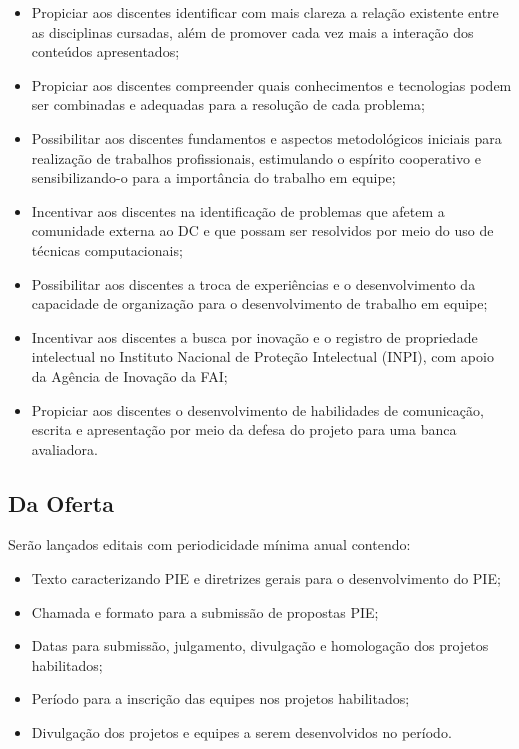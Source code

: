 \begin{itemize}
    \item Propiciar aos discentes identificar com mais clareza a relação existente entre as disciplinas cursadas, além de promover cada vez mais a interação dos conteúdos apresentados;
    
    \item Propiciar aos discentes compreender quais conhecimentos e tecnologias podem ser combinadas e adequadas para a resolução de cada problema;
    
    \item Possibilitar aos discentes fundamentos e aspectos metodológicos iniciais para realização de trabalhos profissionais, estimulando o espírito cooperativo e sensibilizando-o para a importância do trabalho em equipe;
    
    \item Incentivar aos discentes na identificação de problemas que afetem a comunidade externa ao DC e que possam ser resolvidos por meio do uso de técnicas computacionais;
        
    \item Possibilitar aos discentes a troca de experiências e o desenvolvimento da capacidade de organização para o desenvolvimento de trabalho em equipe;
    
    \item Incentivar aos discentes a busca por inovação e o registro de propriedade intelectual no Instituto Nacional de Proteção Intelectual (INPI), com apoio da Agência de Inovação da FAI;
    
    \item Propiciar aos discentes o desenvolvimento de habilidades de comunicação, escrita e apresentação por meio da defesa do projeto para uma banca avaliadora.
\end{itemize}


\subsection{Da Oferta}

Serão lançados editais com periodicidade mínima anual contendo:

\begin{itemize}
    \item Texto caracterizando PIE e diretrizes gerais para o desenvolvimento do PIE;
    \item Chamada e formato para a submissão de propostas PIE;
    \item Datas para submissão, julgamento, divulgação e homologação dos projetos habilitados;
    \item Período para a inscrição das equipes nos projetos habilitados;
    \item Divulgação dos projetos e equipes a serem desenvolvidos no período.
\end{itemize}

